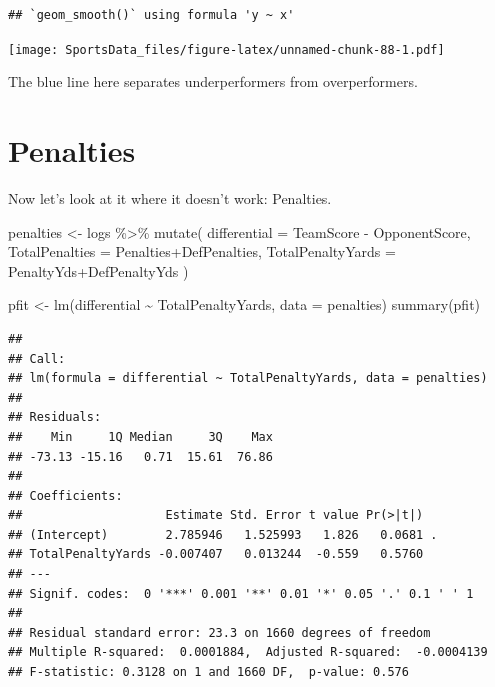 \documentclass[
]{book}
\newenvironment{Shaded}{\begin{snugshade}}{\end{snugshade}}
\newcommand{\AttributeTok}[1]{\textcolor[rgb]{0.77,0.63,0.00}{#1}}
\newcommand{\FunctionTok}[1]{\textcolor[rgb]{0.00,0.00,0.00}{#1}}
\newcommand{\NormalTok}[1]{#1}
\newcommand{\OtherTok}[1]{\textcolor[rgb]{0.56,0.35,0.01}{#1}}
\newcommand{\SpecialCharTok}[1]{\textcolor[rgb]{0.00,0.00,0.00}{#1}}
\begin{document}
\begin{verbatim}
## `geom_smooth()` using formula 'y ~ x'
\end{verbatim}

\texttt{[image: SportsData\_files/figure-latex/unnamed-chunk-88-1.pdf]}

The blue line here separates underperformers from overperformers.

\hypertarget{penalties}{%
\section{Penalties}\label{penalties}}

Now let's look at it where it doesn't work: Penalties.

\begin{Shaded}
\begin{Highlighting}[]
\NormalTok{penalties }\OtherTok{\textless{}{-}}\NormalTok{ logs }\SpecialCharTok{\%\textgreater{}\%} 
  \FunctionTok{mutate}\NormalTok{(}
    \AttributeTok{differential =}\NormalTok{ TeamScore }\SpecialCharTok{{-}}\NormalTok{ OpponentScore, }
    \AttributeTok{TotalPenalties =}\NormalTok{ Penalties}\SpecialCharTok{+}\NormalTok{DefPenalties,}
    \AttributeTok{TotalPenaltyYards =}\NormalTok{ PenaltyYds}\SpecialCharTok{+}\NormalTok{DefPenaltyYds}
\NormalTok{  )}
\end{Highlighting}
\end{Shaded}

\begin{Shaded}
\begin{Highlighting}[]
\NormalTok{pfit }\OtherTok{\textless{}{-}} \FunctionTok{lm}\NormalTok{(differential }\SpecialCharTok{\textasciitilde{}}\NormalTok{ TotalPenaltyYards, }\AttributeTok{data =}\NormalTok{ penalties)}
\FunctionTok{summary}\NormalTok{(pfit)}
\end{Highlighting}
\end{Shaded}

\begin{verbatim}
## 
## Call:
## lm(formula = differential ~ TotalPenaltyYards, data = penalties)
## 
## Residuals:
##    Min     1Q Median     3Q    Max 
## -73.13 -15.16   0.71  15.61  76.86 
## 
## Coefficients:
##                    Estimate Std. Error t value Pr(>|t|)  
## (Intercept)        2.785946   1.525993   1.826   0.0681 .
## TotalPenaltyYards -0.007407   0.013244  -0.559   0.5760  
## ---
## Signif. codes:  0 '***' 0.001 '**' 0.01 '*' 0.05 '.' 0.1 ' ' 1
## 
## Residual standard error: 23.3 on 1660 degrees of freedom
## Multiple R-squared:  0.0001884,  Adjusted R-squared:  -0.0004139 
## F-statistic: 0.3128 on 1 and 1660 DF,  p-value: 0.576
\end{verbatim}
\end{document}
